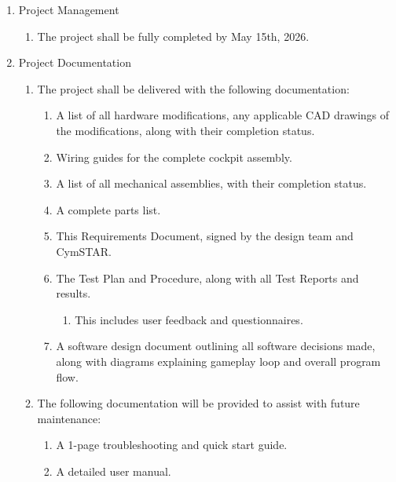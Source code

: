 \documentclass[12pt]{article} %
\begin{document}
\begin{enumerate}[label=\arabic*., leftmargin=*]
	\item Project Management
	\begin{enumerate}[label=\arabic{enumi}.\arabic*., leftmargin=*]
        	\item The project shall be fully completed by May 15th, 2026.
	\end{enumerate}
    
	\item Project Documentation
	\begin{enumerate}[label=\arabic{enumi}.\arabic*., leftmargin=*]
		\item The project shall be delivered with the following documentation:
		\begin{enumerate}[label=\arabic{enumi}.\arabic{enumii}.\arabic*., leftmargin=*]
			\item A list of all hardware modifications, any applicable CAD drawings of the modifications, along with their completion status.
			\item Wiring guides for the complete cockpit assembly.
			\item A list of all mechanical assemblies, with their completion status. 
			\item A complete parts list. 
			\item This Requirements Document, signed by the design team and CymSTAR. 
			\item The Test Plan and Procedure, along with all Test Reports and results. 
		\begin{enumerate}[label=\arabic{enumi}.\arabic{enumii}.\arabic{enumiii}.\alph*., leftmargin=*]
				\item This includes user feedback and questionnaires. 
		\end{enumerate}
			\item A software design document outlining all software decisions made, along with diagrams explaining gameplay loop and overall program flow. 
		\end{enumerate}
		\item The following documentation will be provided to assist with future maintenance:
		\begin{enumerate}[label=\arabic{enumi}.\arabic{enumii}.\arabic*., leftmargin=*]
			\item A 1-page troubleshooting and quick start guide. 
			\item A detailed user manual. 
			\begin{enumerate}[label=\arabic{enumi}.\arabic{enumii}.\arabic{enumiii}.\alph*., leftmargin=*]

\end{enumerate}
\end{enumerate}
\end{enumerate}
\end{enumerate}
\end{document}
